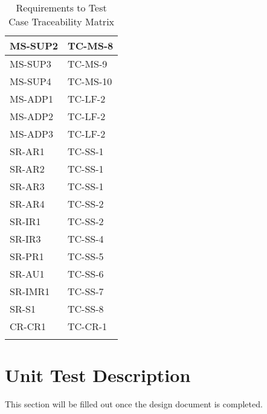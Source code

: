 \documentclass[12pt, titlepage]{article}
\begin{document}
\begin{longtable}{|l|l|}
  MS-SUP2 & TC-MS-8 \\ \hline
  MS-SUP3 & TC-MS-9 \\ \hline
  MS-SUP4 & TC-MS-10 \\ \hline
  MS-ADP1 & TC-LF-2 \\ \hline
  MS-ADP2 & TC-LF-2 \\ \hline
  MS-ADP3 & TC-LF-2 \\ \hline
  SR-AR1 & TC-SS-1 \\ \hline
  SR-AR2 & TC-SS-1 \\ \hline
  SR-AR3 & TC-SS-1 \\ \hline
  SR-AR4 & TC-SS-2 \\ \hline
  SR-IR1 & TC-SS-2 \\ \hline
  SR-IR3 & TC-SS-4 \\ \hline
  SR-PR1 & TC-SS-5\\ \hline
  SR-AU1 & TC-SS-6 \\ \hline
  SR-IMR1 & TC-SS-7 \\ \hline
  SR-S1 & TC-SS-8 \\ \hline
  CR-CR1 & TC-CR-1 \\ \hline
  \caption{Requirements to Test Case Traceability Matrix}
\end{longtable}

\section{Unit Test Description}

This section will be filled out once the design document is completed.



\end{document}
